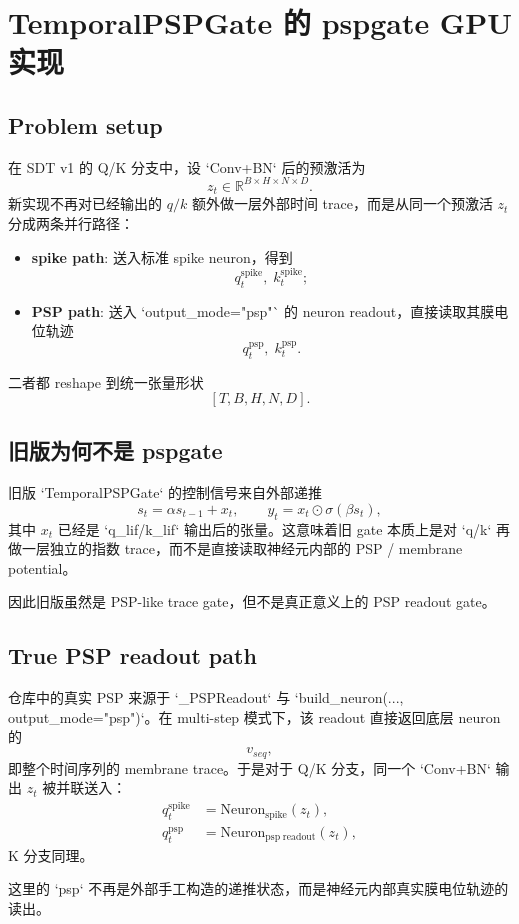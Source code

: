 \section{TemporalPSPGate 的 pspgate GPU 实现}

\subsection{Problem setup}
在 SDT v1 的 Q/K 分支中，设 `Conv+BN` 后的预激活为
\[
z_t \in \mathbb{R}^{B \times H \times N \times D}.
\]
新实现不再对已经输出的 $q/k$ 额外做一层外部时间 trace，而是从同一个预激活 $z_t$ 分成两条并行路径：
\begin{itemize}
  \item \textbf{spike path}: 送入标准 spike neuron，得到
  \[
  q_t^{\mathrm{spike}},\; k_t^{\mathrm{spike}};
  \]
  \item \textbf{PSP path}: 送入 `output_mode="psp"` 的 neuron readout，直接读取其膜电位轨迹
  \[
  q_t^{\mathrm{psp}},\; k_t^{\mathrm{psp}}.
  \]
\end{itemize}
二者都 reshape 到统一张量形状
\[
[T, B, H, N, D].
\]

\subsection{旧版为何不是 pspgate}
旧版 `TemporalPSPGate` 的控制信号来自外部递推
\[
s_t = \alpha s_{t-1} + x_t,
\qquad
y_t = x_t \odot \sigma(\beta s_t),
\]
其中 $x_t$ 已经是 `q_lif/k_lif` 输出后的张量。这意味着旧 gate 本质上是对 `q/k` 再做一层独立的指数 trace，而不是直接读取神经元内部的 PSP / membrane potential。

因此旧版虽然是 PSP-like trace gate，但不是真正意义上的 PSP readout gate。

\subsection{True PSP readout path}
仓库中的真实 PSP 来源于 `_PSPReadout` 与 `build_neuron(..., output_mode="psp")`。在 multi-step 模式下，该 readout 直接返回底层 neuron 的
\[
v_{seq},
\]
即整个时间序列的 membrane trace。于是对于 Q/K 分支，同一个 `Conv+BN` 输出 $z_t$ 被并联送入：
\begin{align}
q_t^{\mathrm{spike}} &= \mathrm{Neuron}_{\mathrm{spike}}(z_t),\\
q_t^{\mathrm{psp}} &= \mathrm{Neuron}_{\mathrm{psp\;readout}}(z_t),
\end{align}
K 分支同理。

这里的 `psp` 不再是外部手工构造的递推状态，而是神经元内部真实膜电位轨迹的读出。

